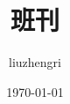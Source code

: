 \documentclass[UTF8]{{ctexbook}}
\begin{document}
\title{班刊}
\author{liuzhengri}
\date{\today}
\maketitle
\tableofcontents

\end{document}
